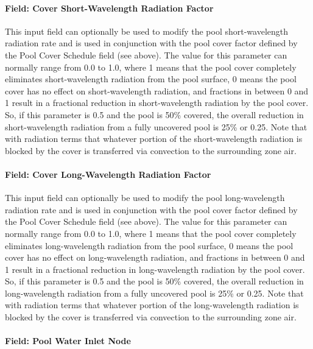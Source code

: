 \paragraph{Field: Cover Short-Wavelength Radiation Factor}\label{field-cover-short-wavelength-radiation-factor}

This input field can optionally be used to modify the pool short-wavelength radiation rate and is used in conjunction with the pool cover factor defined by the Pool Cover Schedule field (see above). The value for this parameter can normally range from 0.0 to 1.0, where 1 means that the pool cover completely eliminates short-wavelength radiation from the pool surface, 0 means the pool cover has no effect on short-wavelength radiation, and fractions in between 0 and 1 result in a fractional reduction in short-wavelength radiation by the pool cover. So, if this parameter is 0.5 and the pool is 50\% covered, the overall reduction in short-wavelength radiation from a fully uncovered pool is 25\% or 0.25. Note that with radiation terms that whatever portion of the short-wavelength radiation is blocked by the cover is transferred via convection to the surrounding zone air.

\paragraph{Field: Cover Long-Wavelength Radiation Factor}\label{field-cover-long-wavelength-radiation-factor}

This input field can optionally be used to modify the pool long-wavelength radiation rate and is used in conjunction with the pool cover factor defined by the Pool Cover Schedule field (see above). The value for this parameter can normally range from 0.0 to 1.0, where 1 means that the pool cover completely eliminates long-wavelength radiation from the pool surface, 0 means the pool cover has no effect on long-wavelength radiation, and fractions in between 0 and 1 result in a fractional reduction in long-wavelength radiation by the pool cover. So, if this parameter is 0.5 and the pool is 50\% covered, the overall reduction in long-wavelength radiation from a fully uncovered pool is 25\% or 0.25. Note that with radiation terms that whatever portion of the long-wavelength radiation is blocked by the cover is transferred via convection to the surrounding zone air.

\paragraph{Field: Pool Water Inlet Node}\label{field-pool-water-inlet-node}

